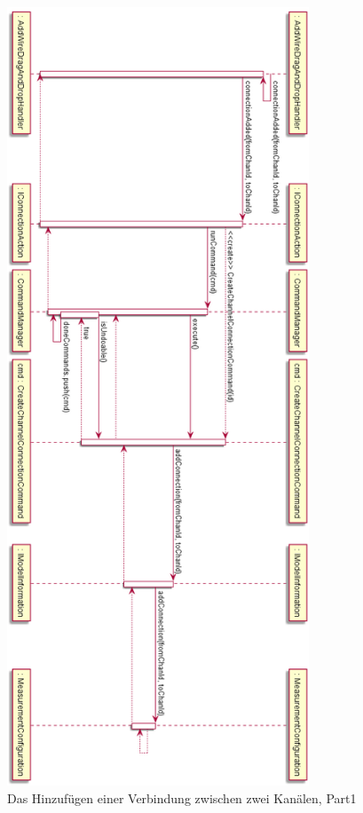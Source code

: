 \documentclass[parskip=full]{scrartcl}
\begin{document}
\begin{figure}[htbp]
	\begin{center}
		\includegraphics[width = 9cm]{Grafiken/AddConQuerPart1.png}
		\caption{Das Hinzufügen einer Verbindung zwischen zwei Kanälen, Part1}
		\label{SeqAddConP1}
	\end{center}
\end{figure}
\end{document}
